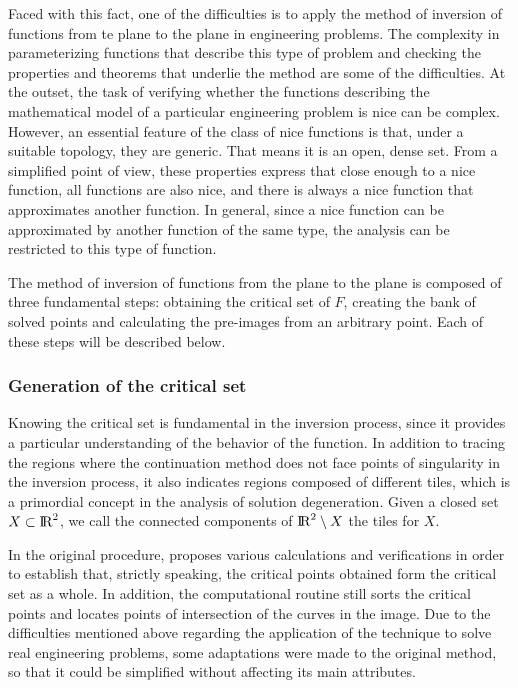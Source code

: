 \documentclass[journal=iecred,manuscript=article]{achemso}
\theoremstyle{definition}
\theoremstyle{remark}
\begin{document}
Faced with this fact, one of the difficulties is to apply the method of inversion of functions from te plane to the plane in engineering problems. The complexity in parameterizing functions that describe this type of problem and checking the properties and theorems that underlie the method are some of the difficulties. At the outset, the task of verifying whether the functions describing the mathematical model of a particular engineering problem is nice can be complex. However, an essential feature of the class of nice functions is that, under a suitable topology, they are generic. That means it is an open, dense set. From a simplified point of view, these properties express that close enough to a nice function, all functions are also nice, and there is always a nice function that approximates another function. In general, since a nice function can be approximated by another function of the same type, the analysis can be restricted to this type of function.

The method of inversion of functions from the plane to the plane is composed of three fundamental steps: obtaining the critical set of $ F $, creating the bank of solved points and calculating the pre-images from an arbitrary point. Each of these steps will be described below.

\subsubsection{Generation of the critical set}

Knowing the critical set is fundamental in the inversion process, since it provides a particular understanding of the behavior of the function. In addition to tracing the regions where the continuation method does not face points of singularity in the inversion process, it also indicates regions composed of different tiles, which is a primordial concept in the analysis of solution degeneration. Given a closed set $ X \subset \text{I\!R}^2 $, we call the connected components of $ \text{I\!R}^2 \setminus X $ the tiles for $ X $.

In the original procedure, \citet{malta} proposes various calculations and verifications in order to establish that, strictly speaking, the critical points obtained form the critical set as a whole. In addition, the computational routine still sorts the critical points and locates points of intersection of the curves in the image. Due to the difficulties mentioned above regarding the application of the technique to solve real engineering problems, some adaptations were made to the original method, so that it could be simplified without affecting its main attributes.
\end{document}

